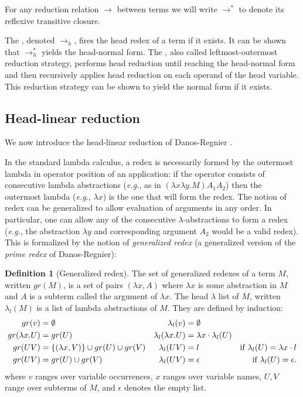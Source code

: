 \documentclass{article}
\makeatletter
\theoremstyle{definition}
\newtheorem{definition}{Definition}[section]
\renewcommand\eg{{\it e.g.\@\xspace}}
\makeatother
\begin{document}
For any reduction relation $\rightarrow$ between terms we will write
$\rightarrow^*$ to denote its reflexive transitive closure.

The , denoted $\rightarrow_{h}$, fires the head redex of a term if it exists. It can be shown that $\rightarrow^*_{h}$ yields the head-normal form. The , also called leftmost-outermost reduction strategy, performs head reduction until reaching the head-normal form and then recursively applies head reduction on each operand of the head variable. This reduction strategy can be shown to yield the normal form if it exists.


\subsection{Head-linear reduction}
We now introduce the head-linear reduction of Danos-Regnier \cite{danos-head}.

In the standard lambda calculus, a redex is necessarily formed by the outermost lambda in operator position of an application: if the operator consists of consecutive lambda abstractions (\eg, as in $(\lambda x \lambda y . M) A_1 A_2$) then the outermost lambda (\eg, $\lambda x$) is the one that will form the redex. The notion of redex can be generalized to allow evaluation of arguments in any order. In particular, one can allow any of the consecutive $\lambda$-abstractions to form a redex (\eg, the abstraction $\lambda y$ and corresponding argument $A_2$ would be a valid redex). This is formalized by the notion of \emph{generalized redex} (a generalized version of the \emph{prime redex} of Danos-Regnier):

\begin{definition}[Generalized redex]
The set of generalized redexes of a term $M$, written $gr(M)$, is a set of pairs $(\lambda x, A)$ where $\lambda x$ is some abstraction in $M$ and $A$ is a subterm called the argument of $\lambda x$. The head $\lambda$ list of $M$, written $\lambda_l(M)$ is a list of lambda abstractions of $M$. They are defined by induction:
\begin{align*}
gr(v) &= \emptyset & \lambda_l(v) &= \emptyset\\
gr(\lambda x. U) &= gr(U) & \lambda_l(\lambda x. U) &= \lambda x \cdot \lambda_l(U) \\
gr(U V) &= \{ (\lambda x, V) \} \cup gr(U) \cup gr(V) &
\lambda_l(U V) &= l & \mbox{if $\lambda_l(U) = \lambda x \cdot l$} \\
gr(U V) &= gr(U) \cup gr(V) & \lambda_l(U V) &= \epsilon & \mbox{if $\lambda_l(U) = \epsilon$.} \\
\end{align*}
where $v$ ranges over variable occurrences, $x$ ranges over variable names, $U, V$ range over subterms of $M$, and $\epsilon$ denotes the empty list.
\end{definition}
\end{document}
